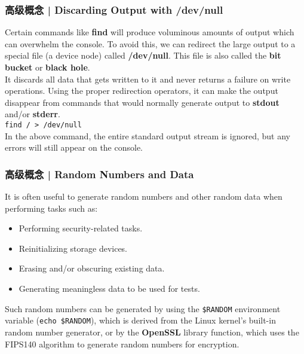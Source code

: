 \begin{frame}[fragile]
  \frametitle{高级概念 | Discarding Output with /dev/null}
  Certain commands like \textbf{find} will produce voluminous amounts of output which can overwhelm the console. To avoid this, we can redirect the large output to a special file (a device node) called \textbf{/dev/null}. This file is also called the \textbf{bit bucket} or \textbf{black hole}.\\
  \vspace{0.3cm}
  It discards all data that gets written to it and never returns a failure on write operations. Using the proper redirection operators, it can make the output disappear from commands that would normally generate output to \textbf{stdout} and/or \textbf{stderr}.\\
  \vspace{0.3cm}
  \verb|find / > /dev/null|\\
  \vspace{0.3cm}
  In the above command, the entire standard output stream is ignored, but any errors will still appear on the console.
\end{frame}

\begin{frame}[fragile]
  \frametitle{高级概念 | Random Numbers and Data}
  It is often useful to generate random numbers and other random data when performing tasks such as:
  \begin{itemize}
    \item Performing security-related tasks.
    \item Reinitializing storage devices.
    \item Erasing and/or obscuring existing data.
    \item Generating meaningless data to be used for tests.
  \end{itemize}
  Such random numbers can be generated by using the \verb|$RANDOM| environment variable (\verb|echo $RANDOM|), which is derived from the Linux kernel's built-in random number generator, or by the \textbf{OpenSSL} library function, which uses the FIPS140 algorithm to generate random numbers for encryption.
\end{frame}

